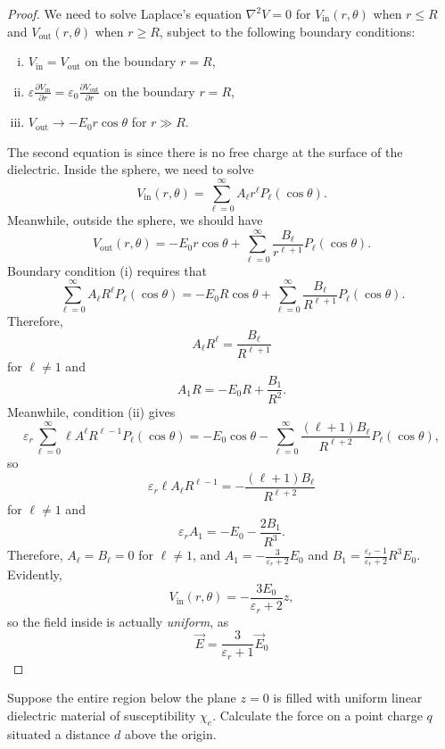 \begin{proof}
We need to solve Laplace's equation $\nabla^2 V=0$ for $V_{\text{in}}(r,\theta)$ when $r\le R$ and $V_{\text{out}}(r,\theta)$ when $r\ge R$, subject to the following boundary conditions:
\begin{enumerate}[(i)]
    \item $V_{\text{in}}=V_{\text{out}}$ on the boundary $r=R$,
    \item $\varepsilon \frac{\partial V_{\text{in}}}{\partial r}=\varepsilon_0\frac{\partial V_{\text{out}}}{\partial r}$ on the boundary $r=R$,
    \item $V_{\text{out}}\to -E_0r\cos\theta$ for $r\gg R$.
\end{enumerate}
The second equation is since there is no free charge at the surface of the dielectric. Inside the sphere, we need to solve
\[V_{\text{in}}(r,\theta)=\sum_{\ell=0}^\infty A_\ell r^\ell P_\ell(\cos\theta).\]
Meanwhile, outside the sphere, we should have
\[V_{\text{out}}(r,\theta)=-E_0r\cos\theta +\sum_{\ell=0}^\infty \frac{B_\ell}{r^{\ell+1}}P_\ell(\cos\theta).\]
Boundary condition (i) requires that
\[\sum_{\ell=0}^\infty A_\ell R^\ell P_\ell(\cos\theta)=-E_0R\cos\theta + \sum_{\ell=0}^\infty \frac{B_\ell}{R^{\ell+1}}P_\ell(\cos\theta).\]
Therefore,
\[A_\ell R^\ell = \frac{B_\ell}{R^{\ell+1}}\]
for $\ell\neq 1$ and
\[A_1R=-E_0R+\frac{B_1}{R^2}.\]
Meanwhile, condition (ii) gives
\[\varepsilon_r\sum_{\ell=0}^\infty \ell A^\ell R^{\ell-1}P_\ell(\cos\theta)=-E_0\cos\theta-\sum_{\ell=0}^\infty\frac{(\ell+1)B_\ell}{R^{\ell+2}}P_\ell(\cos\theta),\]
so
\[\varepsilon_r\ell A_\ell R^{\ell-1}=-\frac{(\ell+1)B_\ell}{R^{\ell+2}}\]
for $\ell\neq 1$ and
\[\varepsilon_rA_1=-E_0-\frac{2B_1}{R^3}.\]
Therefore, $A_\ell=B_\ell=0$ for $\ell\neq 1$, and $A_1=-\frac{3}{\varepsilon_r+2}E_0$ and $B_1=\frac{\varepsilon_r-1}{\varepsilon_r+2}R^3E_0$. Evidently,
\[V_{\text{in}}(r,\theta)=-\frac{3E_0}{\varepsilon_r+2}z,\]
so the field inside is actually \textit{uniform}, as
\[\boxed{\vec{E}=\frac{3}{\varepsilon_r+1}\vec{E}_0}\]
\end{proof}

\begin{example}
Suppose the entire region below the plane $z=0$ is filled with uniform linear dielectric material of susceptibility $\chi_e$. Calculate the force on a point charge $q$ situated a distance $d$ above the origin.
\end{example}

